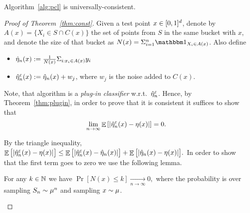 \documentclass[12pt,a4paper,oneside,onecolumn]{book}
\begin{document}
\begin{theorem}
  \label{thm:const}
  Algorithm~\ref{alg:pcl} is universally-consistent. 
  
\end{theorem}

\begin{proof}[Proof of Theorem~\ref{thm:const}]

Given a test point $x\in [0,1]^d$, denote by $A(x) =  \{X_i \in S \cap C(x) \}$ the set of points from $S$ in the same bucket with $x$,
and denote the size of that bucket as $N(x)=\Sigma_{i=1}^{n}{\indicator{X_i \in A(x)}}$. 
Also define
\begin{itemize}
    \item $\hat{\eta}_n(x) := \frac{1}{N(x)} \Sigma_{i:x_i \in A(x) }y_i$
    \item $\hat{\eta}^{\varepsilon}_n(x) := \hat{\eta}_n(x) + w_j$,  
where $w_j$ is the noise added to $C(x)$.
\end{itemize}

%

Note, that algorithm  is a {\em plug-in classifier} w.r.t.\ $\hat{\eta}^{\varepsilon}_n$. Hence, by Theorem~\ref{thm:plugin}, in order to prove that it is consistent it suffices to show that
\[
  \lim_{n\to\infty}\mathop{\mathbb{E}}\left[|\hat{\eta}_n^\varepsilon(x)-\eta(x) |\right] = 0.
\]

By the triangle inequality, 
$
\label{eq:classif}
  \mathop{\mathbb{E}}\big[|\hat{\eta}^{\varepsilon}_n(x)-\eta(x) |\big]
  \leq 
         \mathop{\mathbb{E}}\big[|\hat{\eta}^{\varepsilon}_n(x)-\hat{\eta}_n(x) |\big]
  + \mathop{\mathbb{E}}\big[|\hat{\eta}_n(x) - \eta(x) |\big].    
$
In order to show that the first term goes to zero we  use  the following lemma.
\begin{lemma}
  \label{lem:cubes}
  For any $k \in \mathbb{N}$ we have 
  $\Pr[N(x)\leq k] \xrightarrow[n\to \infty]{} 0,$ 
  where the probability is over sampling $S_n\sim\mu^n$ and sampling $x\sim\mu$.
\end{lemma}


\end{proof}
\end{document}
